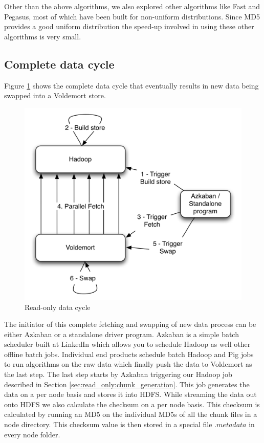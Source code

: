 \documentclass[10pt,twocolumn,preprint,natbib,authoryear]{sigplanconf}
\begin{document}
Other than the above algorithms, we also explored other algorithms like Fast and Pegasus, most of which have been built for non-uniform distributions. Since MD5 provides a good uniform distribution the speed-up involved in using these other algorithms is very small. 


\subsection{Complete data cycle}
\label{sec:read_only:data_cycle}

Figure \ref{cycle} shows the complete data cycle that eventually results in new data being swapped into a Voldemort store. 

\begin{figure}
  \centering
    \includegraphics[scale=0.60]{cycle.png}
  \caption{Read-only data cycle}
  \label{cycle}
\end{figure}

The initiator of this complete fetching and swapping of new data process can be either Azkaban or a standalone driver program. Azkaban\cite{Azkaban} is a simple batch scheduler built at LinkedIn which allows you to schedule Hadoop as well other offline batch jobs. Individual end products schedule batch Hadoop and Pig jobs to run algorithms on the raw data which finally push the data to Voldemort as the last step. The last step starts by Azkaban triggering our Hadoop job described in Section \ref{sec:read_only:chunk_generation}. This job generates the data on a per node basis and stores it into HDFS. While streaming the data out onto HDFS we also calculate the checksum on a per node basis. This checksum is calculated by running an MD5 on the individual MD5s of all the chunk files in a node directory. This checksum value is then stored in a special file $.metadata$ in every node folder. 
\end{document}
